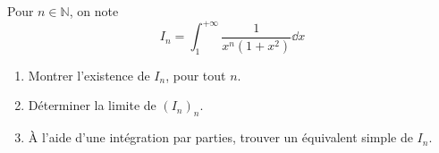 Pour $n \in \mathbb{N}$, on note
$$
I_n=\displaystyle\int_1^{+\infty} \dfrac{1}{x^n\left(1+x^2\right)} \dd x
$$
\begin{enumerate}
\item Montrer l'existence de $I_n$, pour tout $n$.
\item Déterminer la limite de $\left(I_n\right)_n$.
\item À l'aide d'une intégration par parties, trouver un équivalent simple de $I_n$.
\end{enumerate}
